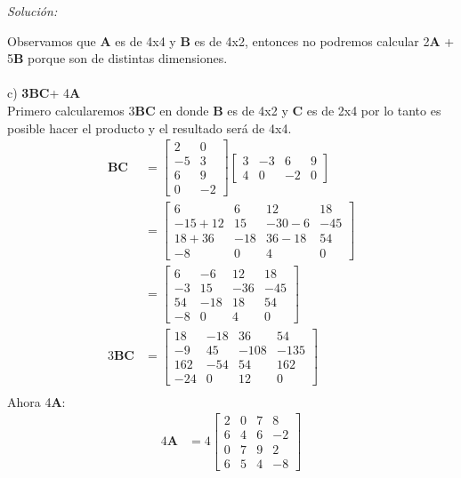 \documentclass[12pt]{article}
\newenvironment{sol}
    {\emph{Solución:}
    }
    {
    }
\begin{document}
\begin{sol}
Observamos que \textbf{A} es de 4x4 y \textbf{B} es de 4x2, entonces no podremos calcular 2\textbf{A} + 5\textbf{B} porque son de distintas dimensiones.\\ \\
c) \textbf{3BC}+ 4\textbf{A}\\
Primero calcularemos 3\textbf{BC} en donde \textbf{B} es de 4x2 y \textbf{C} es de 2x4 por lo tanto es posible hacer el producto y el resultado será de 4x4.\\
\begin{align*}
	\textbf{BC} &= 
	\begin{bmatrix}
		2 & 0 \\
		-5 & 3 \\
		6 & 9 \\
		0 & -2
	\end{bmatrix}
	\begin{bmatrix}
		3 & -3 & 6 & 9 \\
		4 & 0 & -2 & 0
	\end{bmatrix} \\
	&= \begin{bmatrix}
		6 & 6 & 12 & 18 \\
		-15+12 & 15 & -30-6 & -45 \\
		18+36 & -18 & 36-18 & 54 \\
		-8 & 0 & 4 & 0
	\end{bmatrix}\\
	&= \begin{bmatrix}
		6 & -6 & 12 & 18 \\
		-3 & 15 & -36 & -45 \\
		54 & -18 & 18 & 54 \\
		-8 & 0 & 4 & 0
	\end{bmatrix}\\
	3\textbf{BC}&=
	\begin{bmatrix}
		18 & -18 & 36 & 54 \\
		-9 & 45 & -108 & -135 \\
		162 & -54 & 54 & 162 \\
		-24 & 0 & 12 & 0
	\end{bmatrix}\\
	\end{align*}
Ahora 4\textbf{A}:
\begin{align*}
	4\textbf{A} &= 4
	\begin{bmatrix}
		2 & 0 & 7 & 8 \\
		6 & 4 & 6 & -2 \\
		0 & 7 & 9 & 2 \\
		6 & 5 & 4 & -8

\end{bmatrix}
\end{align*}
\end{sol}
\end{document}
